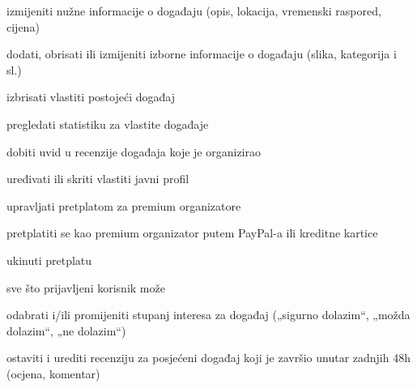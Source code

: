\begin{packed_enum}
\begin{packed_enum}
\begin{packed_enum}
						\item izmijeniti nužne informacije o događaju (opis, lokacija, vremenski raspored, cijena)
						\item dodati, obrisati ili izmijeniti izborne informacije o događaju (slika, kategorija i sl.)
						
					\end{packed_enum}
					\item izbrisati vlastiti postojeći događaj
					\item pregledati statistiku za vlastite događaje
					\item dobiti uvid u recenzije događaja koje je organizirao
					\item uređivati ili skriti vlastiti javni profil
					\item upravljati pretplatom za premium organizatore
					\begin{packed_enum}
						
						\item pretplatiti se kao premium organizator putem PayPal-a ili kreditne kartice
						\item ukinuti pretplatu
						
					\end{packed_enum}
				
				\end{packed_enum}

				\item {}
				
				\begin{packed_enum}
					
					\item sve što prijavljeni korisnik može
					\item odabrati i/ili promijeniti stupanj interesa za događaj („sigurno dolazim“, „možda dolazim“, „ne dolazim“)
					\item ostaviti i urediti recenziju za posjećeni događaj koji je završio unutar zadnjih 48h (ocjena, komentar)
					
				\end{packed_enum}
			
				\item  {}
				
				\begin{packed_enum}
					

\end{packed_enum}
\end{packed_enum}
